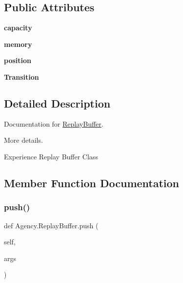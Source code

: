 \subsection*{Public Attributes}
\begin{DoxyCompactItemize}
\item 
\mbox{\label{classAgency_1_1ReplayBuffer_aa7be9fdc4ca2207005cb997ecd16cefe}} 
{\bfseries capacity}
\item 
\mbox{\label{classAgency_1_1ReplayBuffer_aabee82626e7bdea8a188ae1fd7783430}} 
{\bfseries memory}
\item 
\mbox{\label{classAgency_1_1ReplayBuffer_a74ddbf1602593e4d1de547773c61a67c}} 
{\bfseries position}
\item 
\mbox{\label{classAgency_1_1ReplayBuffer_a3472d419a502e3331128f223253d4a78}} 
{\bfseries Transition}
\end{DoxyCompactItemize}


\subsection{Detailed Description}
Documentation for \mbox{\hyperlink{classAgency_1_1ReplayBuffer}{Replay\+Buffer}}. 

More details. \begin{DoxyVerb}Experience Replay Buffer Class \end{DoxyVerb}
 

\subsection{Member Function Documentation}
\mbox{\label{classAgency_1_1ReplayBuffer_a42eb421de8a87af670f58c2c9f47819c}} 
\subsubsection{\texorpdfstring{push()}{push()}}
{\footnotesize\ttfamily def Agency.\+Replay\+Buffer.\+push (\begin{DoxyParamCaption}\item[{}]{self,  }\item[{}]{args }\end{DoxyParamCaption})}

